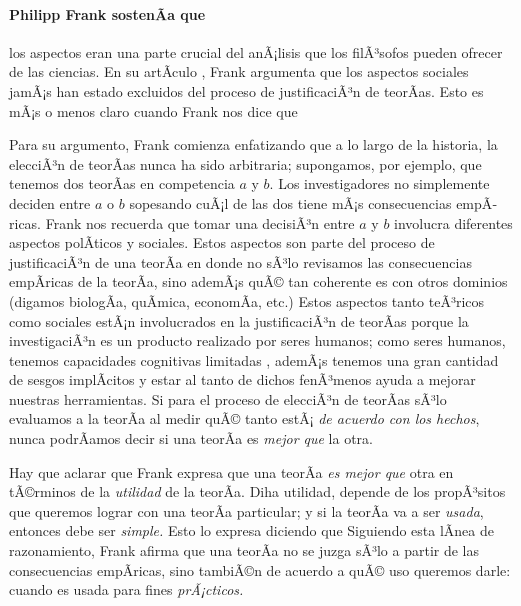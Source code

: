 \paragraph{Philipp Frank sostenÃ­a que} los aspectos  eran
una parte crucial del anÃ¡lisis que los filÃ³sofos pueden ofrecer de las
ciencias. En su artÃ­culo , Frank argumenta que los
aspectos sociales jamÃ¡s han estado excluidos del proceso de
justificaciÃ³n de teorÃ­as. Esto es mÃ¡s o menos claro cuando Frank nos dice
que 
\parencite[p.~143]{Frank1954}

Para su argumento, Frank comienza enfatizando que a lo largo de la historia, la elecciÃ³n de teorÃ­as nunca ha sido arbitraria;
supongamos, por ejemplo, que tenemos dos teorÃ­as en competencia $a$ y $b$.
Los investigadores no simplemente deciden entre $a$ o $b$ sopesando cuÃ¡l de las dos tiene mÃ¡s consecuencias empÃ­ricas.
Frank nos recuerda que tomar una decisiÃ³n entre $a$ y $b$ involucra diferentes aspectos polÃ­ticos y sociales.
Estos aspectos son parte del proceso de justificaciÃ³n de una teorÃ­a en donde no sÃ³lo revisamos las consecuencias empÃ­ricas de la teorÃ­a, sino ademÃ¡s quÃ© tan coherente es con otros dominios (digamos biologÃ­a, quÃ­mica, economÃ­a, etc.)
Estos aspectos tanto teÃ³ricos como sociales estÃ¡n involucrados en la justificaciÃ³n de teorÃ­as porque la investigaciÃ³n es un producto realizado por seres humanos;
como seres humanos, tenemos capacidades cognitivas limitadas \parencite{Potochnik2017-POTIAT-3}, ademÃ¡s tenemos una gran cantidad de sesgos implÃ­citos \parencite{nordell2021end} y estar al tanto de dichos fenÃ³menos ayuda a mejorar nuestras herramientas.
Si para el proceso de elecciÃ³n de teorÃ­as sÃ³lo evaluamos a la teorÃ­a al medir quÃ© tanto estÃ¡ \emph{de acuerdo con los hechos}, nunca podrÃ­amos decir si una teorÃ­a es \emph{mejor que} la otra.

Hay que aclarar que Frank expresa que una teorÃ­a \emph{es mejor que} otra en tÃ©rminos de la \emph{utilidad} de la teorÃ­a.
Diha utilidad, depende de los propÃ³sitos que queremos lograr con una teorÃ­a particular;
y si la teorÃ­a va a ser \emph{usada}, entonces debe ser \emph{simple.}
Esto lo expresa diciendo que  \parencite[p.~14]{Frank1956} Siguiendo esta lÃ­nea de
razonamiento, Frank afirma que una teorÃ­a no se juzga sÃ³lo a partir de las
consecuencias empÃ­ricas, sino tambiÃ©n de acuerdo a quÃ© uso queremos darle:
cuando es usada para fines \emph{prÃ¡cticos.}

